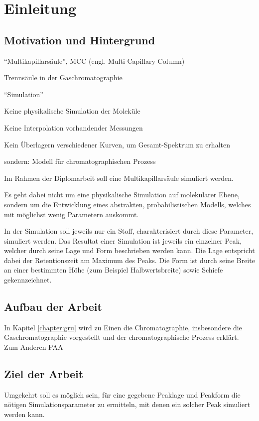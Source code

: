 \label{chapter:ein}

\chapter{Einleitung}

\section{Motivation und Hintergrund}
``Multikapillarsäule'', MCC (engl. Multi Capillary Column)

Trennsäule in der Gaschromatographie

``Simulation''

Keine physikalische Simulation der Moleküle

 Keine Interpolation vorhandender Messungen

 Kein Überlagern verschiedener Kurven, um Gesamt-Spektrum zu erhalten
 
 sondern: Modell für chromatographischen Prozess



Im Rahmen der Diplomarbeit soll eine Multikapillarsäule simuliert werden. 

Es geht dabei nicht um eine physikalische Simulation auf molekularer Ebene, sondern um die Entwicklung eines abstrakten, probabilistischen Modells, welches mit möglichst wenig Parametern auskommt. 

In der Simulation soll jeweils nur ein Stoff, charakterisiert durch diese Parameter, simuliert werden. Das Resultat einer Simulation ist jeweils ein einzelner Peak, welcher durch seine Lage und Form beschrieben werden kann. Die Lage entspricht dabei der Retentionszeit am Maximum des Peaks. Die Form ist durch seine Breite an einer bestimmten Höhe (zum Beispiel Halbwertsbreite) sowie Schiefe gekennzeichnet.



\section{Aufbau der Arbeit}
In Kapitel \ref{chapter:gru} wird zu Einen die Chromatographie, insbesondere die Gaschromatographie vorgestellt und der chromatographische Prozess erklärt. Zum Anderen PAA

\section{Ziel der Arbeit}
Umgekehrt soll es möglich sein, für eine gegebene Peaklage und Peakform die nötigen Simulationsparameter zu ermitteln, mit denen ein solcher Peak simuliert werden kann.

